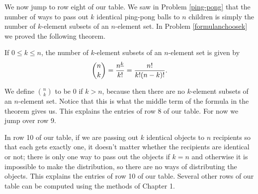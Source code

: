 We now jump to row eight of our table.  We saw  in Problem
\ref{ping-pong} that the number of ways to pass out $k$ identical
ping-pong balls to $n$ children is simply the number of $k$-element
subsets of an $n$-element set.  In Problem \ref{formulanchoosek} we proved
the following theorem.
\begin{theorem}  If $0\le k \le n$, the number of $k$-element subsets of
an
$n$-element set is given by $${n\choose k} = {n^{\underline{k}}\over k!}
= {n!\over k!(n-k)!}.$$
\end{theorem}
We define $n \choose k$ to be 0 if $k>n$, because then there are no
$k$-element subsets of an $n$-element set.  Notice that this is what the
middle term of the formula in the theorem gives us.  This explains the
entries of row 8 of our table.  For now we jump over row 9.

In row 10 of our table, if we are passing out $k$ identical objects to
$n$ recipients so that each gets exactly one, it doesn't matter whether
the recipients are identical or not; there is only one way to pass out
the objects if $k=n$ and otherwise it is impossible to make the
distribution, so there are no ways of distributing the objects.    This
explains the entries of row 10 of our table.  Several other rows of our
table can be computed using the methods of Chapter 1.

